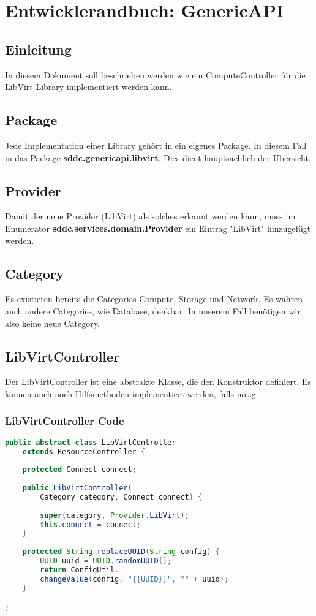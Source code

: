 \chapter{Entwicklerandbuch: GenericAPI}
\section{Einleitung}
In diesem Dokument soll beschrieben werden wie ein ComputeController für die LibVirt Library implementiert werden kann. 

\section{Package}
Jede Implementation einer Library gehört in ein eigenes Package. In diesem Fall in das Package 
\textbf{sddc.genericapi.libvirt}. Dies dient hauptsächlich der Übersicht.

\section{Provider}
Damit der neue Provider (LibVirt) als solches erkannt werden kann, muss im Enumerator 
\textbf{sddc.services.domain.Provider} ein Eintrag "LibVirt" hinzugefügt werden.


\section{Category}
Es existieren bereits die Categories Compute, Storage und Network. Es währen auch andere Categories, wie Database, denkbar. In unserem Fall benötigen wir also keine neue Category.

\newpage

\section{LibVirtController}
Der LibVirtController ist eine abstrakte Klasse, die den Konstruktor definiert. Es können auch noch Hilfsmethoden implementiert werden, falls nötig.

\subsection{LibVirtController Code}

\begin{lstlisting}[language=Java,frame=single,caption={LibVirtController Code}] 
public abstract class LibVirtController 
	extends ResourceController {
	
	protected Connect connect;
	
	public LibVirtController(
		Category category, Connect connect) {
		
		super(category, Provider.LibVirt);
		this.connect = connect;
	}
	
	protected String replaceUUID(String config) {
		UUID uuid = UUID.randomUUID();
		return ConfigUtil.
		changeValue(config, "{{UUID}}", "" + uuid);
	}

}
\end{lstlisting}
